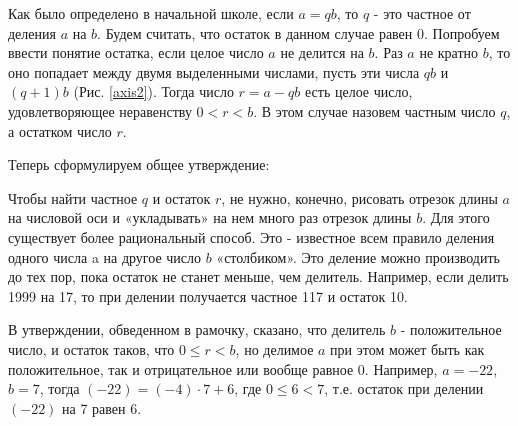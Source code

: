 Как было определено в начальной школе, если $a = qb$, то $q$ - это частное от деления $a$ на $b$. Будем считать, что остаток в данном случае равен $0$. Попробуем ввести понятие остатка, если целое число $a$ не делится на $b$. Раз $a$ не кратно $b$, то оно попадает между двумя выделенными числами, пусть эти числа $qb$ и $(q+1)b$ (Рис. \ref{axis2}). Тогда число $r = a - qb$ есть целое число, удовлетворяющее неравенству $0 < r < b$. В этом случае назовем частным число $q$, а остатком число $r$. 

Теперь сформулируем общее утверждение:


Чтобы найти частное $q$ и остаток $r$, не нужно, конечно, рисовать отрезок длины $a$ на числовой оси и «укладывать» на нем много раз отрезок длины $b$. Для этого существует более рациональный способ. Это - известное всем правило деления одного числа a на другое число $b$ «столбиком». Это деление можно производить до тех пор, пока остаток не станет меньше, чем делитель. Например, если делить 1999 на 17, то при делении получается частное 117 и остаток 10.

\begin{prim}
В утверждении, обведенном в рамочку, сказано, что делитель $b$ - положительное число, и остаток таков, что $0  \leqslant r < b$, но делимое $a$ при этом может быть как положительное, так и отрицательное или вообще равное $0$. Например, $a = -22$, $b = 7$, тогда   $(-22) = (-4)\cdot 7 + 6$, где $0 \leqslant 6 <7$, т.е. остаток при делении $(-22)$ на 7 равен 6.
\end{prim}


